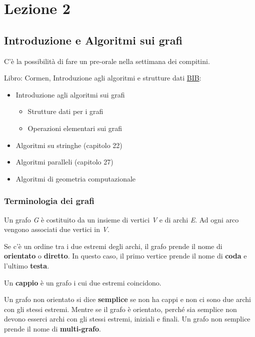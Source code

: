 \chapter{Lezione 2}
\section{Introduzione e Algoritmi sui grafi}\label{lezione-2---introduzione-e-algoritmi-sui-grafi}

C'è la possibilità di fare un pre-orale nella settimana dei compitini.

Libro: Cormen, Introduzione agli algoritmi e strutture dati
\href{http://catalogo.unipd.it/F/FCKK1DACESL2TDH5CF15FLDL2BUM936U1XG9U15MFDCKI764BV-10675?func=full-set-set\&set_number=011139\&set_entry=000001\&format=999}{BIB}:

\begin{itemize}
\item
  Introduzione agli algoritmi sui grafi
  \begin{itemize}
  \item
    Strutture dati per i grafi
  \item
    Operazioni elementari sui grafi
  \end{itemize}
\item
  Algoritmi su stringhe (capitolo 22)
\item
  Algoritmi paralleli (capitolo 27)
\item
  Algoritmi di geometria computazionale
\end{itemize}

\subsection{Terminologia dei grafi}\label{terminologia-dei-grafi}

Un grafo \emph{G} è costituito da un insieme di vertici \emph{V} e di
archi \emph{E}. Ad ogni arco vengono associati due vertici in \emph{V}.

Se c'è un ordine tra i due estremi degli archi, il grafo prende il nome
di \textbf{orientato} o \textbf{diretto}. In questo caso, il primo
vertice prende il nome di \textbf{coda} e l'ultimo \textbf{testa}.

Un \textbf{cappio} è un grafo i cui due estremi coincidono.

Un grafo non orientato si dice \textbf{semplice} se non ha cappi e non
ci sono due archi con gli stessi estremi. Mentre se il grafo è
orientato, perché sia semplice non devono esserci archi con gli stessi
estremi, iniziali e finali. Un grafo non semplice prende il nome di
\textbf{multi-grafo}.


